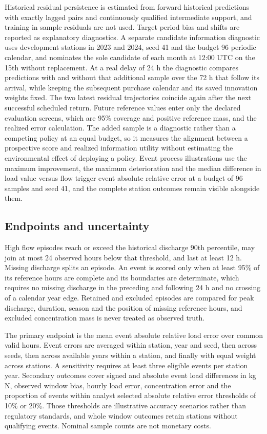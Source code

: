 \documentclass[lineno,pdflatex,sn-apa]{sn-jnl}%
\theoremstyle{thmstyleone}%
\theoremstyle{thmstyletwo}%
\theoremstyle{thmstylethree}%
\begin{document}
Historical residual persistence is estimated from forward historical predictions with exactly lagged pairs and continuously qualified intermediate support, and training in sample residuals are not used. Target period bias and shifts are reported as explanatory diagnostics. A separate candidate information diagnostic uses development stations in 2023 and 2024, seed 41 and the budget 96 periodic calendar, and nominates the sole candidate of each month at 12:00 UTC on the 15th without replacement. At a real delay of 24 h the diagnostic compares predictions with and without that additional sample over the 72 h that follow its arrival, while keeping the subsequent purchase calendar and its saved innovation weights fixed. The two latest residual trajectories coincide again after the next successful scheduled return. Future reference values enter only the declared evaluation screens, which are 95\% coverage and positive reference mass, and the realized error calculation. The added sample is a diagnostic rather than a competing policy at an equal budget, so it measures the alignment between a prospective score and realized information utility without estimating the environmental effect of deploying a policy. Event process illustrations use the maximum improvement, the maximum deterioration and the median difference in load value versus flow trigger event absolute relative error at a budget of 96 samples and seed 41, and the complete station outcomes remain visible alongside them.

\subsection{Endpoints and uncertainty}

High flow episodes reach or exceed the historical discharge 90th percentile, may join at most 24 observed hours below that threshold, and last at least 12 h. Missing discharge splits an episode. An event is scored only when at least 95\% of its reference hours are complete and its boundaries are determinate, which requires no missing discharge in the preceding and following 24 h and no crossing of a calendar year edge. Retained and excluded episodes are compared for peak discharge, duration, season and the position of missing reference hours, and excluded concentration mass is never treated as observed truth.

The primary endpoint is the mean event absolute relative load error over common valid hours. Event errors are averaged within station, year and seed, then across seeds, then across available years within a station, and finally with equal weight across stations. A sensitivity requires at least three eligible events per station year. Secondary outcomes cover signed and absolute event load differences in kg N, observed window bias, hourly load error, concentration error and the proportion of events within analyst selected absolute relative error thresholds of 10\% or 20\%. Those thresholds are illustrative accuracy scenarios rather than regulatory standards, and whole window outcomes retain stations without qualifying events. Nominal sample counts are not monetary costs.
\end{document}
